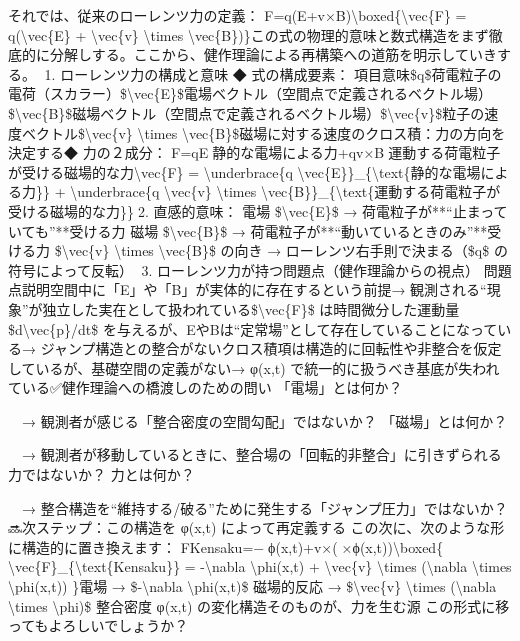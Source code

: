 \documentclass{article}
\begin{document}
それでは、従来のローレンツ力の定義：
F⃗=q(E⃗+v⃗×B⃗)\textbackslash{}boxed\{\textbackslash{}vec\{F\} = q(\textbackslash{}vec\{E\} + \textbackslash{}vec\{v\} \textbackslash{}times \textbackslash{}vec\{B\})\}この式の物理的意味と数式構造をまず徹底的に分解しする。ここから、健作理論による再構築への道筋を明示していきする。
📘1. ローレンツ力の構成と意味
◆ 式の構成要素：
項目意味\$q\$荷電粒子の電荷（スカラー）\$\textbackslash{}vec\{E\}\$電場ベクトル（空間点で定義されるベクトル場）\$\textbackslash{}vec\{B\}\$磁場ベクトル（空間点で定義されるベクトル場）\$\textbackslash{}vec\{v\}\$粒子の速度ベクトル\$\textbackslash{}vec\{v\} \textbackslash{}times \textbackslash{}vec\{B\}\$磁場に対する速度のクロス積：力の方向を決定する◆ 力の２成分：
F⃗=qE⃗⏟静的な電場による力+qv⃗×B⃗⏟運動する荷電粒子が受ける磁場的な力\textbackslash{}vec\{F\} = \textbackslash{}underbrace\{q \textbackslash{}vec\{E\}\}\_\{\textbackslash{}text\{静的な電場による力\}\} + \textbackslash{}underbrace\{q \textbackslash{}vec\{v\} \textbackslash{}times \textbackslash{}vec\{B\}\}\_\{\textbackslash{}text\{運動する荷電粒子が受ける磁場的な力\}\}🔎2. 直感的意味：
電場 \$\textbackslash{}vec\{E\}\$ → 荷電粒子が**“止まっていても”**受ける力
磁場 \$\textbackslash{}vec\{B\}\$ → 荷電粒子が**“動いているときのみ”**受ける力
\$\textbackslash{}vec\{v\} \textbackslash{}times \textbackslash{}vec\{B\}\$ の向き → ローレンツ右手則で決まる（\$q\$ の符号によって反転）
🔁3. ローレンツ力が持つ問題点（健作理論からの視点）
問題点説明空間中に「E」や「B」が実体的に存在するという前提→ 観測される“現象”が独立した実在として扱われている\$\textbackslash{}vec\{F\}\$ は時間微分した運動量 \$d\textbackslash{}vec\{p\}/dt\$ を与えるが、EやBは“定常場”として存在していることになっている→ ジャンプ構造との整合がないクロス積項は構造的に回転性や非整合を仮定しているが、基礎空間の定義がない→ φ(x,t) で統一的に扱うべき基底が失われている✅健作理論への橋渡しのための問い
「電場」とは何か？

　→ 観測者が感じる「整合密度の空間勾配」ではないか？
「磁場」とは何か？

　→ 観測者が移動しているときに、整合場の「回転的非整合」に引きずられる力ではないか？
力とは何か？

　→ 整合構造を“維持する/破る”ために発生する「ジャンプ圧力」ではないか？
🔜次ステップ：この構造を φ(x,t) によって再定義する
この次に、次のような形に構造的に置き換えます：
F⃗Kensaku=−∇ϕ(x,t)+v⃗×(∇×ϕ(x,t))\textbackslash{}boxed\{
\textbackslash{}vec\{F\}\_\{\textbackslash{}text\{Kensaku\}\} = -\textbackslash{}nabla \textbackslash{}phi(x,t) + \textbackslash{}vec\{v\} \textbackslash{}times (\textbackslash{}nabla \textbackslash{}times \textbackslash{}phi(x,t))
\}電場 → \$-\textbackslash{}nabla \textbackslash{}phi(x,t)\$
磁場的反応 → \$\textbackslash{}vec\{v\} \textbackslash{}times (\textbackslash{}nabla \textbackslash{}times \textbackslash{}phi)\$
整合密度 φ(x,t) の変化構造そのものが、力を生む源
この形式に移ってもよろしいでしょうか？
\end{document}
